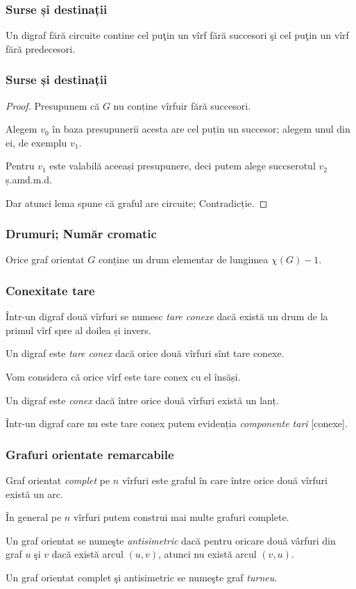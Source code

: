 \begin{frame}
  \frametitle{Surse și destinații}

\begin{theorem}
Un digraf fără circuite contine cel puţin un vîrf fără succesori şi cel puţin un vîrf fără predecesori.
\end{theorem}


\end{frame}

\begin{frame}
  \frametitle{Surse și destinații}

\begin{proof}
Presupunem că $G$ nu conține vîrfuir fără succesori.

Alegem $v_0$ în baza presupunerii acesta are cel puțin un succesor; alegem unul din ei, de exemplu $v_1$.

Pentru $v_1$ este valabilă aceeași presupunere, deci putem alege succserotul $v_2$ ș.amd.m.d.

Dar atunci lema spune că graful are circuite; Contradicție.
\end{proof}

\end{frame}

\begin{frame}
  \frametitle{Drumuri; Număr cromatic}

\begin{theorem}
Orice graf orientat $G$ conține un drum elementar de lungimea $\chi(G)-1$.
\end{theorem}

\end{frame}

\begin{frame}
  \frametitle{Conexitate tare}

Într-un digraf două vîrfuri se numesc \emph{tare conexe} dacă există un drum de la primul vîrf spre al doilea și invers.

Un digraf este \emph{tare conex} dacă orice două vîrfuri sînt tare conexe.

Vom considera că orice vîrf este tare conex cu el însăși.

Un digraf este \emph{conex} dacă între orice două vîrfuri există un lanț.

Într-un digraf care nu este tare conex putem evidenția \emph{componente tari} [conexe].

\end{frame}


\begin{frame}
  \frametitle{Grafuri orientate remarcabile}

Graf orientat \emph{complet} pe $n$ vîrfuri este graful în care între orice două vîrfuri există un arc.

În general pe $n$ vîrfuri putem construi mai multe grafuri complete.

Un graf orientat se numeşte \emph{antisimetric} dacă pentru oricare două vârfuri din graf $u$ şi $v$ dacă există arcul $(u,v)$, atunci nu există arcul $(v,u)$.

Un graf orientat complet şi antisimetric se numeşte graf \emph{turneu}.
\end{frame}

